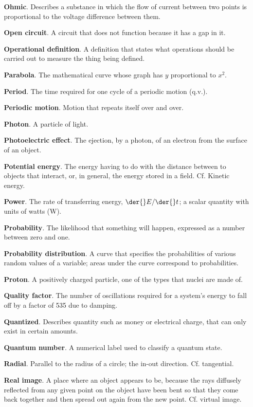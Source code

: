 \textbf{Ohmic}. Describes a substance in which the flow of current between two points is proportional to the
voltage difference between them. 

\textbf{Open circuit}. A circuit that does not function because it has a gap in it. 

\textbf{Operational definition}. A definition that states what operations should be carried out to measure the
thing being
defined. 

\textbf{Parabola}. The mathematical curve whose graph has $y$ proportional to $x^2$.

\textbf{Period}. The time required for one cycle of a periodic motion (q.v.). 

\textbf{Periodic motion}. Motion that repeats itself over and over. 

\textbf{Photon}. A particle of light.

\textbf{Photoelectric effect}. The ejection, by a photon, of an electron from the surface of an object.

\textbf{Potential energy}. The energy having to do with the distance between to objects that interact, or,
in general, the energy stored in a field. Cf. Kinetic energy. 

\textbf{Power}. The rate of transferring energy, $\der{}E/\der{}t$; a scalar quantity with units of watts (W).

\textbf{Probability}. The likelihood that something will happen, expressed as a number between zero and one.

\textbf{Probability distribution}. A curve that specifies the probabilities of various random values of a
variable; areas under the curve correspond to probabilities.

\textbf{Proton}. A positively charged particle, one of the types that nuclei are made of. 

\textbf{Quality factor}. The number of oscillations required for a system's energy to fall off by a factor of
535 due to
damping. 

\textbf{Quantized}. Describes quantity such as money or electrical charge, that can only exist in certain
amounts. 

\textbf{Quantum number}. A numerical label used to classify a quantum state.

\textbf{Radial}. Parallel to the radius of a circle; the in-out direction. Cf. tangential.

\textbf{Real image}. A place where an object appears to be, because the rays diffusely reflected from any
given point on the object have been bent so that they come back together and then spread out again from the
new point. Cf. virtual image. 

